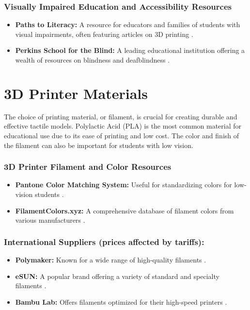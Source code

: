\subsubsection{Visually Impaired Education and Accessibility Resources}
\begin{itemize}
	\item \textbf{Paths to Literacy:} A resource for educators and families of students with visual impairments, often featuring articles on 3D printing \supercite{PathsToLiteracy}.
	\item \textbf{Perkins School for the Blind:} A leading educational institution offering a wealth of resources on blindness and deafblindness \supercite{Perkins}.
\end{itemize}

\section{3D Printer Materials}\label{ch5:sec:materials}
The choice of printing material, or filament, is crucial for creating durable and effective tactile models. Polylactic Acid (PLA) is the most common material for educational use due to its ease of printing and low cost. The color and finish of the filament can also be important for students with low vision.\supercite{FilamentColors, Pantone}

\subsubsection{3D Printer Filament and Color Resources}
\begin{itemize}
	\item \textbf{Pantone Color Matching System:} Useful for standardizing colors for low-vision students \supercite{Pantone}.
	\item \textbf{FilamentColors.xyz:} A comprehensive database of filament colors from various manufacturers \supercite{FilamentColors}.
\end{itemize}

\subsubsection{International Suppliers (prices affected by tariffs):}
\begin{itemize}
	\item \textbf{Polymaker:} Known for a wide range of high-quality filaments \supercite{Polymaker}.
	\item \textbf{eSUN:} A popular brand offering a variety of standard and specialty filaments \supercite{eSUN}.
	\item \textbf{Bambu Lab:} Offers filaments optimized for their high-speed printers \supercite{BambuLab}.
\end{itemize}

